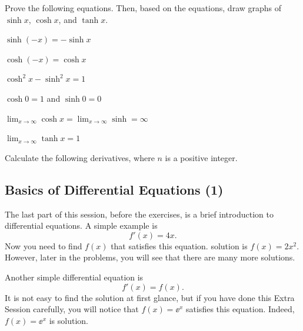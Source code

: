 \documentclass[11pt,pdfa,lastpage]{MishoNote}
\begin{document}
\ornamentskip

\begin{enumerate}[resume]
  \itemA Prove the following equations. Then, based on the equations, draw graphs of $\sinh x$, $\cosh x$, and $\tanh x$.
  \begin{menumerate}{2}
    \item $\sinh(-x)=-\sinh x$
    \item $\cosh(-x)=\cosh x$
    \item $\cosh^2x-\sinh^2x=1$
    \item $\cosh 0=1$ and $\sinh 0=0$
    \item $\displaystyle\lim_{x\to\infty}\cosh x=\lim_{x\to\infty}\sinh=\infty$
    \item $\displaystyle\lim_{x\to\infty}\tanh x=1$
  \end{menumerate}
  \itemC Calculate the following derivatives, where $n$ is a positive integer.
  \begin{menumerate}{3}
\end{menumerate}
\end{enumerate}

\newpage

\subsection{Basics of Differential Equations (1)}
The last part of this session, before the exercises, is a brief introduction to differential equations.
A simple example is
\[ f'(x)=4x. \]
Now you need to find $f(x)$ that satisfies this equation.
 solution is $f(x)=2x^2$. However, later in the problems, you will see that there are many more solutions.

Another simple differential equation is
\[ f'(x) = f(x). \]
It is not easy to find the solution at first glance, but if you have done this Extra Session carefully, you will notice that $f(x)=\ee^x$ satisfies this equation. Indeed, $f(x)=\ee^x$ is  solution.

\ornamentskip
\end{document}
